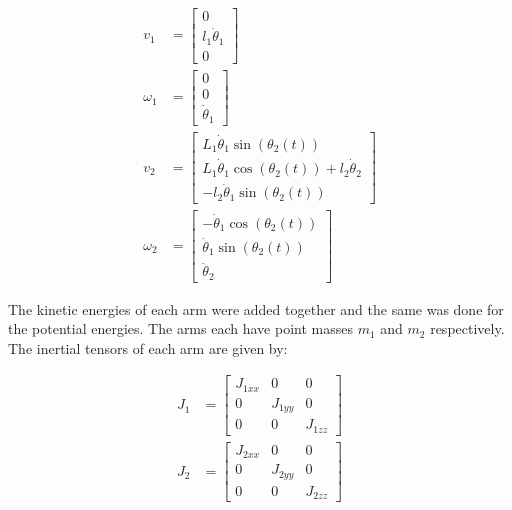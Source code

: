 \documentclass[letterpaper,10pt,oneside]{article}
\begin{document}
\begin{align}
  v_{1} &=
  \left[\begin{matrix}
  0 \\
  l_{1} \dot{\theta}_{1} \\
  0\end{matrix}\right] \\
  \omega_{1} &=
  \left[\begin{matrix}
  0 \\
  0 \\
  \dot{\theta}_{1}
  \end{matrix}\right] \\
  v_{2} &=
  \left[\begin{matrix}
  L_{1} \dot{\theta}_{1} \sin{\left(\theta_{2}{\left(t \right)} \right)} \\
  L_{1} \dot{\theta}_{1} \cos{\left(\theta_{2}{\left(t \right)} \right)} + l_{2} \dot{\theta}_{2} \\
  - l_{2} \dot{\theta}_{1} \sin{\left(\theta_{2}{\left(t \right)} \right)}
  \end{matrix}\right] \\
  \omega_{2} &=
  \left[\begin{matrix}
  - \dot{\theta}_{1} \cos{\left(\theta_{2}{\left(t \right)} \right)} \\
  \dot{\theta}_{1} \sin{\left(\theta_{2}{\left(t \right)} \right)} \\
  \dot{\theta}_{2}
  \end{matrix}\right]
\end{align}


The kinetic energies of each arm were added together and the same was done for the potential energies. The arms each have point masses $m_{1}$ and $m_{2}$ respectively. The inertial tensors of each arm are given by:

\begin{align}
  J_{1} &=
  \left[\begin{matrix}
  J_{1xx} & 0 & 0 \\
  0 & J_{1yy} & 0 \\
  0 & 0 & J_{1zz}
  \end{matrix}\right] \\
  J_{2} &=
  \left[\begin{matrix}
  J_{2xx} & 0 & 0 \\
  0 & J_{2yy} & 0 \\
  0 & 0 & J_{2zz}
  \end{matrix}\right]
\end{align}
\end{document}
